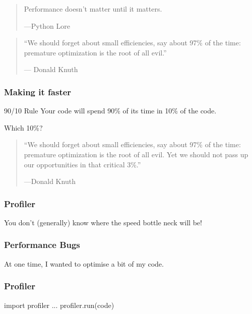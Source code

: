 \begin{frame}[fragile]

\begin{quote}
Performance doesn't matter until it matters.

---Python Lore
\end{quote}

\end{frame}

\begin{frame}[fragile]

\begin{quote}
``We should forget about small efficiencies, say about 97\% of the time: premature optimization is the root of all evil.''

--- Donald Knuth
\end{quote}

\end{frame}

\begin{frame}[fragile]
\frametitle{Making it faster}
\begin{block}{90/10 Rule}
Your code will spend 90\% of its time in 10\% of the code.
\end{block}

\pause
\bigskip
Which 10\%?
\end{frame}

\begin{frame}[fragile]

\begin{quote}
``We should forget about small efficiencies, say about 97\% of the time: premature optimization is the root of all evil. Yet we should not pass up our opportunities in that critical 3\%.''

---Donald Knuth
\end{quote}

\end{frame}

\begin{frame}[fragile]
\frametitle{Profiler}

You don't (generally) know where the speed bottle neck will be!
\end{frame}

\begin{frame}[fragile]
\frametitle{Performance Bugs}

At one time, I wanted to optimise a bit of my code.

\end{frame}

\begin{frame}[fragile]
\frametitle{Profiler}

\begin{python}
import profiler
...
profiler.run(code)
\end{python}
\end{frame}

